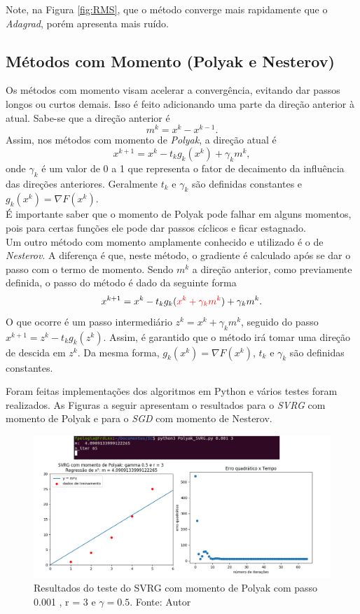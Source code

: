 \documentclass[a4paper,12pt]{article}
\begin{document}
Note, na Figura \ref{fig:RMS}, que o método converge mais rapidamente que o \textit{Adagrad}, porém apresenta mais ruído.




\subsection{Métodos com Momento (Polyak e Nesterov)}
Os métodos com momento visam acelerar a convergência, evitando dar passos longos ou curtos demais. Isso é feito adicionando uma parte da direção anterior à atual.
Sabe-se que a direção anterior é 
$$m^k=x^{k}-x^{k-1}.$$
Assim, nos métodos com momento de \textit{Polyak}, a direção atual é
$$x^{k+1}=x^k-t_k g_k(x^k)+\gamma_k m^k,$$
onde $\gamma_k$ é um valor de 0 a 1 que representa o fator de decaimento da influência das direções anteriores. Geralmente $t_k$ e $\gamma_k$ são definidas constantes e $g_k(x^k)=\nabla F(x^k)$.\\

É importante saber que o momento de Polyak pode falhar em alguns momentos, pois para certas funções ele pode dar passos cíclicos e ficar estagnado.\\

Um outro método com momento amplamente conhecido e utilizado é o de \textit{Nesterov}. A diferença é que, neste método, o gradiente é calculado após se dar o passo com o termo de momento. Sendo $m^k$ a direção anterior, como previamente definida, o passo do método é dado da seguinte forma
$$x^{k+1}=x^k-t_k g_k({\color{red} x^k+\gamma_k m^k})+\gamma_k m^k.$$
O que ocorre é um passo intermediário $z^k=x^k+\gamma_k m^k$, seguido do passo  $x^{k+1}=z^k-t_k g_k(z^k)$.
Assim, é garantido que o método irá tomar uma direção de descida em $z^k$.
Da mesma forma, $g_k(x^k)=\nabla F(x^k)$, $t_k$ e $\gamma_k$ são definidas constantes.

Foram feitas implementações dos algoritmos em Python e vários testes foram realizados. As Figuras a seguir apresentam o resultados para o \textit{SVRG} com momento de Polyak e para o \textit{SGD} com momento de Nesterov.

\begin{figure}[H]
\centering 
\includegraphics[scale=0.5]{Figuras/Polyak.png}
\caption{Resultados do teste do SVRG com momento de Polyak com passo 0.001 , r = 3 e $\gamma = 0.5$. Fonte: Autor}
\end{figure}
\end{document}
